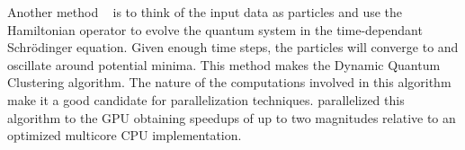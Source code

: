 Another method ~\cite{Weinstein2009} is to think of the input data as particles and use the Hamiltonian operator to evolve the quantum system in the time-dependant Schrödinger equation. Given enough time steps, the particles will converge to and oscillate around potential minima. This method makes the Dynamic Quantum Clustering algorithm.
The nature of the computations involved in this algorithm make it a good candidate for parallelization techniques. \cite{Wittek2013} parallelized this algorithm to the GPU obtaining speedups of up to two magnitudes relative to an optimized multicore CPU implementation.



%



%



%

%



